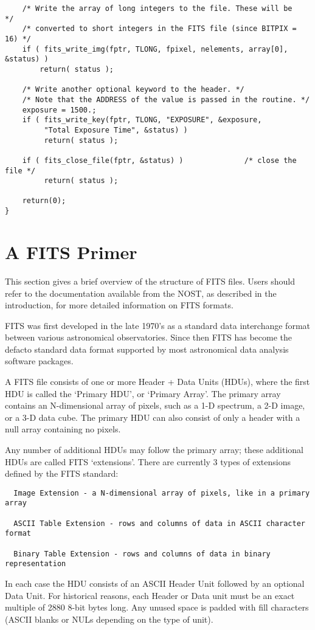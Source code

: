 \begin{verbatim}
    /* Write the array of long integers to the file. These will be      */
    /* converted to short integers in the FITS file (since BITPIX = 16) */
    if ( fits_write_img(fptr, TLONG, fpixel, nelements, array[0], &status) )
        return( status );

    /* Write another optional keyword to the header. */
    /* Note that the ADDRESS of the value is passed in the routine. */
    exposure = 1500.;
    if ( fits_write_key(fptr, TLONG, "EXPOSURE", &exposure,
         "Total Exposure Time", &status) )
         return( status );

    if ( fits_close_file(fptr, &status) )              /* close the file */
         return( status );

    return(0);
}
\end{verbatim}

\chapter{  A FITS Primer }

This section gives a brief overview of the structure of FITS files.
Users should refer to the documentation available from the NOST, as
described in the introduction, for more detailed information on FITS
formats.

FITS was first developed in the late 1970's as a standard data
interchange format between various astronomical observatories.  Since
then FITS has become the defacto standard data format supported by most
astronomical data analysis software packages.

A FITS file consists of one or more Header + Data Units (HDUs), where
the first HDU is called the `Primary HDU', or `Primary Array'.  The
primary array contains an N-dimensional array of pixels, such as a 1-D
spectrum, a 2-D image, or a 3-D data cube.  The primary HDU can also
consist of only a header with a null array containing no pixels.

Any number of additional HDUs may follow the primary array; these
additional HDUs are called FITS `extensions'.  There are currently 3
types of extensions defined by the FITS standard:

\begin{verbatim}
  Image Extension - a N-dimensional array of pixels, like in a primary array

  ASCII Table Extension - rows and columns of data in ASCII character format

  Binary Table Extension - rows and columns of data in binary representation
\end{verbatim}
In each case the HDU consists of an ASCII Header Unit followed by an optional
Data Unit.  For historical reasons, each Header or Data unit must be an
exact multiple of 2880 8-bit bytes long.  Any unused space is padded
with fill characters (ASCII blanks or NULs depending on the type of unit).

